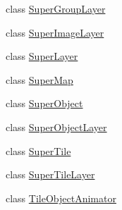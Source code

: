 \begin{DoxyCompactItemize}
\item 
class \mbox{\hyperlink{class_super_tiled2_unity_1_1_super_group_layer}{Super\+Group\+Layer}}
\item 
class \mbox{\hyperlink{class_super_tiled2_unity_1_1_super_image_layer}{Super\+Image\+Layer}}
\item 
class \mbox{\hyperlink{class_super_tiled2_unity_1_1_super_layer}{Super\+Layer}}
\item 
class \mbox{\hyperlink{class_super_tiled2_unity_1_1_super_map}{Super\+Map}}
\item 
class \mbox{\hyperlink{class_super_tiled2_unity_1_1_super_object}{Super\+Object}}
\item 
class \mbox{\hyperlink{class_super_tiled2_unity_1_1_super_object_layer}{Super\+Object\+Layer}}
\item 
class \mbox{\hyperlink{class_super_tiled2_unity_1_1_super_tile}{Super\+Tile}}
\item 
class \mbox{\hyperlink{class_super_tiled2_unity_1_1_super_tile_layer}{Super\+Tile\+Layer}}
\item 
class \mbox{\hyperlink{class_super_tiled2_unity_1_1_tile_object_animator}{Tile\+Object\+Animator}}
\end{DoxyCompactItemize}
